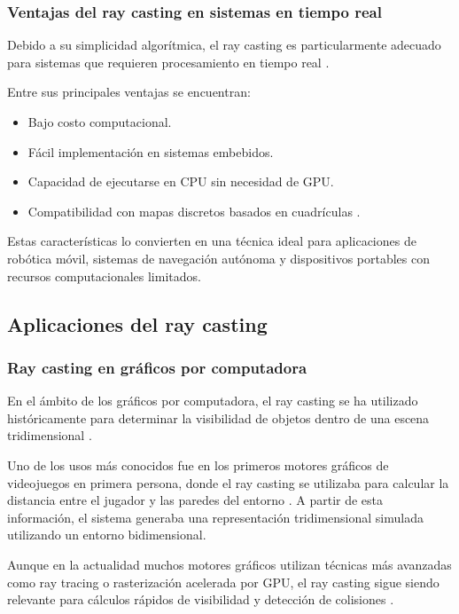 \subsubsection{Ventajas del ray casting en sistemas en tiempo real}

Debido a su simplicidad algorítmica, el ray casting es particularmente adecuado para sistemas que requieren procesamiento en tiempo real \cite{stackoverflow_raycasting}.

Entre sus principales ventajas se encuentran:

\begin{itemize}
\item Bajo costo computacional.
\item Fácil implementación en sistemas embebidos.
\item Capacidad de ejecutarse en CPU sin necesidad de GPU.
\item Compatibilidad con mapas discretos basados en cuadrículas \cite{elfes1989}.
\end{itemize}

Estas características lo convierten en una técnica ideal para aplicaciones de robótica móvil, sistemas de navegación autónoma y dispositivos portables con recursos computacionales limitados.

\subsection{Aplicaciones del ray casting}

\subsubsection{Ray casting en gráficos por computadora}

En el ámbito de los gráficos por computadora, el ray casting se ha utilizado históricamente para determinar la visibilidad de objetos dentro de una escena tridimensional \cite{stackoverflow_raycasting}.

Uno de los usos más conocidos fue en los primeros motores gráficos de videojuegos en primera persona, donde el ray casting se utilizaba para calcular la distancia entre el jugador y las paredes del entorno \cite{wikipedia_wolfenstein}. A partir de esta información, el sistema generaba una representación tridimensional simulada utilizando un entorno bidimensional.

Aunque en la actualidad muchos motores gráficos utilizan técnicas más avanzadas como ray tracing o rasterización acelerada por GPU, el ray casting sigue siendo relevante para cálculos rápidos de visibilidad y detección de colisiones \cite{stackoverflow_raycasting}.

